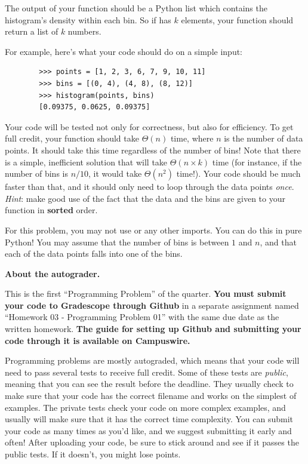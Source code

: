 \begin{progprob}
    The output of your function should be a Python list which contains the
    histogram's density within each bin. So if  has $k$ elements,
    your function should return a list of $k$ numbers.

    For example, here's what your code should do on a simple input:

    \begin{verbatim}
        >>> points = [1, 2, 3, 6, 7, 9, 10, 11]
        >>> bins = [(0, 4), (4, 8), (8, 12)]
        >>> histogram(points, bins)
        [0.09375, 0.0625, 0.09375]
    \end{verbatim}

    Your code will be tested not only for correctness, but also for efficiency.
    To get full credit, your function should take $\Theta(n)$ time, where $n$
    is the number of data points. It should take this time regardless of the
    number of bins! Note that there is a simple, inefficient solution that will
    take $\Theta(n \times k)$ time (for instance, if the number of bins is
    $n/10$, it would take $\Theta(n^2)$ time!). Your code should be much faster
    than that, and it should only need to loop through the data points
    \emph{once}. \emph{Hint}: make good use of the fact that the data and the
    bins are given to your function in \textbf{sorted} order.

    For this problem, you may not use  or any other imports. You can
    do this in pure Python! You may assume that the number of bins is between $1$
    and $n$, and that each of the data points falls into one of the bins.

    \textbf{About the autograder.} 
    
    This is the first ``Programming Problem'' of
    the quarter. \textbf{You must submit your code to Gradescope through Github} in a 
    separate assignment named ``Homework 03 - Programming Problem 01'' with 
    the same due date as the written homework. \textbf{The guide for setting up Github 
    and submitting your code through it is available on Campuswire.} 

    Programming problems are mostly autograded, which means that your code will
    need to pass several tests to receive full credit. Some of these tests are
    \emph{public}, meaning that you can see the result before the deadline.
    They usually check to make sure that your code has the correct filename and
    works on the simplest of examples. The private tests check your code on
    more complex examples, and usually will make sure that it has the correct
    time complexity. You can submit your code as many times as you'd like, and
    we suggest submitting it early and often! After uploading your code, be
    sure to stick around and see if it passes the public tests. If it doesn't,
    you might lose points.



\end{progprob}
